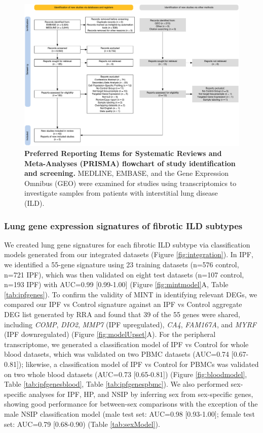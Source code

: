 \documentclass[
]{article}
\begin{document}
\begin{figure}

{\centering \includegraphics[width=0.9\linewidth,]{./Figures/SysReview/Figure1_Prisma} 

}

\caption[PRISMA diagram]{\textbf{Preferred Reporting Items for Systematic Reviews and Meta-Analyses (PRISMA) flowchart of study identification and screening.} MEDLINE, EMBASE, and the Gene Expression Omnibus (GEO) were examined for studies using transcriptomics to investigate samples from patients with interstitial lung disease (ILD).}\label{fig:prisma}
\end{figure}

\subsubsection{Lung gene expression signatures of fibrotic ILD subtypes}\label{lung-gene-expression-signatures-of-fibrotic-ild-subtypes}

We created lung gene signatures for each fibrotic ILD subtype via classification models generated from our integrated datasets (Figure \ref{fig:integration}). In IPF, we identified a 55-gene signature using 23 training datasets (n=576 control, n=721 IPF), which was then validated on eight test datasets (n=107 control, n=193 IPF) with AUC=0.99 {[}0.99-1.00{]} (Figure \ref{fig:mintmodel}A, Table \ref{tab:ipfgenes}). To confirm the validity of MINT in identifying relevant DEGs, we compared our IPF vs Control signature against an IPF vs Control aggregate DEG list generated by RRA and found that 39 of the 55 genes were shared, including \textit{COMP}, \textit{DIO2}, \textit{MMP7} (IPF upregulated), \textit{CA4}, \textit{FAM167A}, and \textit{MYRF} (IPF downregulated) (Figure \ref{fig:modelUpset}A). For the peripheral transcriptome, we generated a classification model of IPF vs Control for whole blood datasets, which was validated on two PBMC datasets (AUC=0.74 {[}0.67-0.81{]}); likewise, a classification model of IPF vs Control for PBMCs was validated on two whole blood datasets (AUC=0.73 {[}0.65-0.81{]}) (Figure \ref{fig:bloodmodel}, Table \ref{tab:ipfgenesblood}, Table \ref{tab:ipfgenespbmc}). We also performed sex-specific analyses for IPF, HP, and NSIP by inferring sex from sex-specific genes, showing good performance for between-sex comparisons with the exception of the male NSIP classification model (male test set: AUC=0.98 {[}0.93-1.00{]}; female test set: AUC=0.79 {[}0.68-0.90) (Table \ref{tab:sexModel}).
\end{document}
